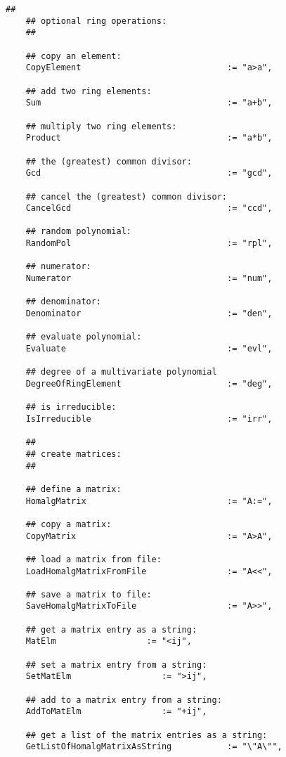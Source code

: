 \documentclass[a4paper,11pt]{report}
\begin{document}
{{{\begin{Verbatim}[fontsize=\small,frame=single,label=Code]
    ##
    ## optional ring operations:
    ##
    
    ## copy an element:
    CopyElement                             := "a>a",
    
    ## add two ring elements:
    Sum                                     := "a+b",
    
    ## multiply two ring elements:
    Product                                 := "a*b",
    
    ## the (greatest) common divisor:
    Gcd                                     := "gcd",
    
    ## cancel the (greatest) common divisor:
    CancelGcd                               := "ccd",
    
    ## random polynomial:
    RandomPol                               := "rpl",
    
    ## numerator:
    Numerator                               := "num",
    
    ## denominator:
    Denominator                             := "den",
    
    ## evaluate polynomial:
    Evaluate                                := "evl",
    
    ## degree of a multivariate polynomial
    DegreeOfRingElement                     := "deg",
    
    ## is irreducible:
    IsIrreducible                           := "irr",
    
    ##
    ## create matrices:
    ##
    
    ## define a matrix:
    HomalgMatrix                            := "A:=",
    
    ## copy a matrix:
    CopyMatrix                              := "A>A",
    
    ## load a matrix from file:
    LoadHomalgMatrixFromFile                := "A<<",
    
    ## save a matrix to file:
    SaveHomalgMatrixToFile                  := "A>>",
    
    ## get a matrix entry as a string:
    MatElm                  := "<ij",
    
    ## set a matrix entry from a string:
    SetMatElm                  := ">ij",
    
    ## add to a matrix entry from a string:
    AddToMatElm                := "+ij",
    
    ## get a list of the matrix entries as a string:
    GetListOfHomalgMatrixAsString           := "\"A\"",
    

\end{Verbatim}}}}
\end{document}
